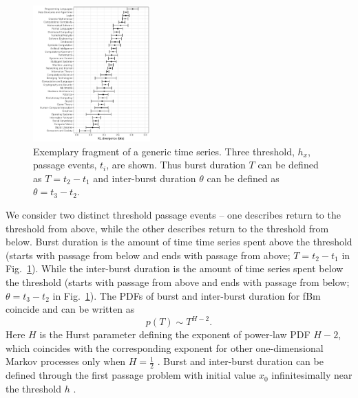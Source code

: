 \documentclass{article}
\newcommand\figref[1]{Fig.~\ref{#1}}
\newcommand{\subfigf}{0.4\textwidth}
\begin{document}
\begin{figure}[h]
\centering
\includegraphics[width=\subfigf]{fig1.pdf}
\caption{\label{fig1} Exemplary fragment of a generic time series. Three threshold, $h_x$, passage events, $t_i$, are shown. Thus burst duration $T$ can be defined as $T=t_2-t_1$  and inter-burst duration $\theta$ can be defined as  $\theta=t_3-t_2$.}
\end{figure}

We consider two distinct threshold passage events -- one describes return to the threshold from above, while the other describes return to the threshold from below. Burst duration is the amount of time time series spent above the threshold (starts with passage from below and ends with passage from above; $T=t_2-t_1$  in \figref{fig1}). While the inter-burst duration is the amount of time series spent below the threshold (starts with passage from above and ends with passage from below; $\theta=t_3-t_2$ in \figref{fig1}). 
The PDFs of burst and inter-burst duration for fBm coincide and can be written as \cite{Ding1995PhysRevE,Metzler2014Springer} 
\begin{equation}
p(T) \sim T^{H-2}.
\label{eq:TPDF}
\end{equation}
Here $H$ is the Hurst parameter defining the exponent of power-law PDF $H-2$, which coincides with the corresponding exponent for other one-dimensional Markov processes only when $H=\frac{1}{2}$  \cite{Borodin2002Birkhauser,Jeanblanc2009Springer,Gardiner2009Springer,Redner2001Cambridge}. Burst and inter-burst duration can be defined through the first passage problem with initial value $x_0$ infinitesimally near the threshold $h$ \cite{Gontis2012ACS}.
\end{document}
